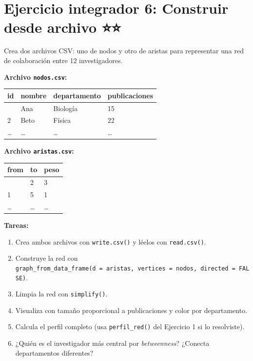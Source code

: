 \documentclass[
  letterpaper,
  DIV=11,
  numbers=noendperiod]{scrreprt}
\providecommand{\tightlist}{%
  \setlength{\itemsep}{0pt}\setlength{\parskip}{0pt}}
\begin{document}
\section*{Ejercicio integrador 6: Construir desde archivo
⭐⭐}\label{ejercicio-integrador-6-construir-desde-archivo}


Crea dos archivos CSV: uno de nodos y otro de aristas para representar
una red de colaboración entre 12 investigadores.

\textbf{Archivo \texttt{nodos.csv}:}

\begin{longtable}[]{@{}llll@{}}
\toprule\noalign{}
id & nombre & departamento & publicaciones \\
\midrule\noalign{}
\endhead
\bottomrule\noalign{}
\endlastfoot
1 & Ana & Biología & 15 \\
2 & Beto & Física & 22 \\
\ldots{} & \ldots{} & \ldots{} & \ldots{} \\
\end{longtable}

\textbf{Archivo \texttt{aristas.csv}:}

\begin{longtable}[]{@{}lll@{}}
\toprule\noalign{}
from & to & peso \\
\midrule\noalign{}
\endhead
\bottomrule\noalign{}
\endlastfoot
1 & 2 & 3 \\
1 & 5 & 1 \\
\ldots{} & \ldots{} & \ldots{} \\
\end{longtable}

\textbf{Tareas:}

\begin{enumerate}
\def\labelenumi{\alph{enumi})}
\tightlist
\item
  Crea ambos archivos con \texttt{write.csv()} y léelos con
  \texttt{read.csv()}.
\item
  Construye la red con
  \texttt{graph\_from\_data\_frame(d\ =\ aristas,\ vertices\ =\ nodos,\ directed\ =\ FALSE)}.
\item
  Limpia la red con \texttt{simplify()}.
\item
  Visualiza con tamaño proporcional a publicaciones y color por
  departamento.
\item
  Calcula el perfil completo (usa \texttt{perfil\_red()} del Ejercicio 1
  si lo resolviste).
\item
  ¿Quién es el investigador más central por \emph{betweenness}? ¿Conecta
  departamentos diferentes?
\end{enumerate}
\end{document}
